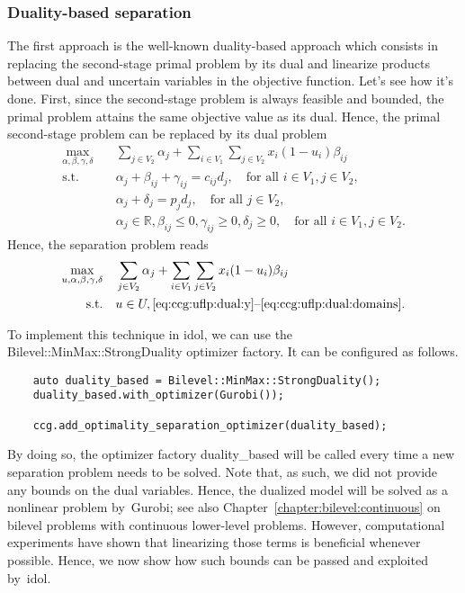 \subsubsection{Duality-based separation}

The first approach is the well-known duality-based approach which consists in
replacing the second-stage primal problem by its dual and linearize products
between dual and uncertain variables in the objective function. Let's see how
it's done. First, since the second-stage problem is always feasible and
bounded, the primal problem attains the same objective value as its dual.
Hence, the primal second-stage problem can be replaced by its dual problem
% 
\begin{subequations}
    \begin{align}
        \max_{\alpha,\beta,\gamma,\delta} \quad & \sum_{ j\in V_2 } \alpha_j + \sum_{i\in V_1} \sum_{j\in V_2} x_i(1 - u_i) \beta_{ij} \\
        \text{s.t.} \quad & \alpha_j + \beta_{ij} + \gamma_{ij} = c_{ij}d_j, \quad \text{for all }i\in V_1, j\in V_2,
        \label{eq:ccg:uflp:dual:y} \\
        & \alpha_j + \delta_j = p_jd_j, \quad\text{for all } j\in V_2, \\
        & \alpha_j\in\mathbb{R}, \beta_{ij} \le 0, \gamma_{ij} \ge 0, \delta_j \ge 0, \quad \text{for all } i\in V_1, j\in V_2.
        \label{eq:ccg:uflp:dual:domains}
    \end{align}
\end{subequations}
Hence, the separation problem reads 
\begin{align*}
    \max_{u,\alpha,\beta,\gamma,\delta} \quad & \sum_{ j\in V_2 } \alpha_j + \sum_{i\in V_1} \sum_{j\in V_2} x_i(1 - u_i)\beta_{ij} \\
    \text{s.t.} \quad & u\in U, \text{\eqref{eq:ccg:uflp:dual:y}--\eqref{eq:ccg:uflp:dual:domains}}.
\end{align*}

To implement this technique in \textsf{idol}, we can use the
\textsf{Bilevel::MinMax::StrongDuality} optimizer factory. It can be
configured as follows.
%
\begin{lstlisting}
    auto duality_based = Bilevel::MinMax::StrongDuality();
    duality_based.with_optimizer(Gurobi());

    ccg.add_optimality_separation_optimizer(duality_based);
\end{lstlisting}

By doing so, the optimizer factory \textsf{duality\_based} will be called
every time a new separation problem needs to be solved. Note that, as such, we
did not provide any bounds on the dual variables. Hence, the dualized model
will be solved as a nonlinear problem by~\textsf{Gurobi}; see also
Chapter~\ref{chapter:bilevel:continuous} on bilevel problems with continuous
lower-level problems. However, computational experiments have shown that
linearizing those terms is beneficial whenever possible. Hence, we now show
how such bounds can be passed and exploited by~\textsf{idol}.

